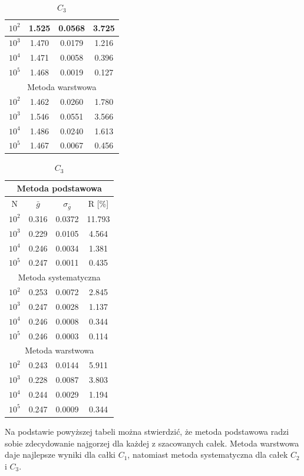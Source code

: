 \documentclass[a4paper,12pt,twoside]{article}
\begin{document}
\begin{table}[h!]
\begin{minipage}[t]{0.32\textwidth}
\begin{tabular}{|c|c|c|c|}
$10^2$ & 1.525 & 0.0568 & 3.725 \\ \hline
$10^3$ & 1.470 & 0.0179 & 1.216 \\ \hline
$10^4$ & 1.471 & 0.0058 & 0.396 \\ \hline
$10^5$ & 1.468 & 0.0019 & 0.127 \\ \hline
\multicolumn{4}{|c|}{Metoda warstwowa} \\ \hline
$10^2$ & 1.462 & 0.0260 & 1.780 \\ \hline
$10^3$ & 1.546 & 0.0551 & 3.566 \\ \hline
$10^4$ & 1.486 & 0.0240 & 1.613 \\ \hline
$10^5$ & 1.467 & 0.0067 & 0.456 \\ \hline
\end{tabular}
\end{minipage}
\hfill
\begin{minipage}[t]{0.32\textwidth}
\centering
\caption*{$C_3$}
\begin{tabular}{|c|c|c|c|}
\hline
\multicolumn{4}{|c|}{Metoda podstawowa} \\ \hline
N & $\bar{g}$ & $\sigma_{\bar{g}}$ & R [\%] \\ \hline
$10^2$ & 0.316 & 0.0372 & 11.793 \\ \hline
$10^3$ & 0.229 & 0.0105 & 4.564 \\ \hline
$10^4$ & 0.246 & 0.0034 & 1.381 \\ \hline
$10^5$ & 0.247 & 0.0011 & 0.435 \\ \hline
\multicolumn{4}{|c|}{Metoda systematyczna} \\ \hline
$10^2$ & 0.253 & 0.0072 & 2.845 \\ \hline
$10^3$ & 0.247 & 0.0028 & 1.137 \\ \hline
$10^4$ & 0.246 & 0.0008 & 0.344 \\ \hline
$10^5$ & 0.246 & 0.0003 & 0.114 \\ \hline
\multicolumn{4}{|c|}{Metoda warstwowa} \\ \hline
$10^2$ & 0.243 & 0.0144 & 5.911 \\ \hline
$10^3$ & 0.228 & 0.0087 & 3.803 \\ \hline
$10^4$ & 0.244 & 0.0029 & 1.194 \\ \hline
$10^5$ & 0.247 & 0.0009 & 0.344 \\ \hline
\end{tabular}
\end{minipage}
\end{table}

Na podstawie powyższej tabeli można stwierdzić, że metoda podstawowa radzi sobie zdecydowanie najgorzej dla każdej z szacowanych całek. Metoda warstwowa daje najlepsze wyniki dla całki $C_1$, natomiast metoda systematyczna dla całek $C_2$ i $C_3$.
\end{document}
